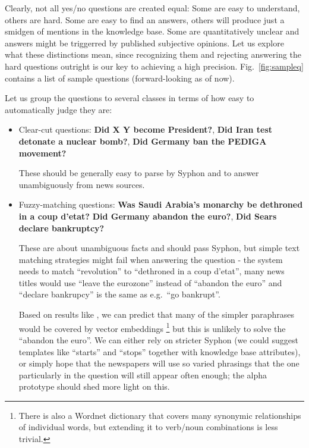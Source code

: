 \documentclass[11pt,a4paper]{article}
\begin{document}
Clearly, not all yes/no questions are created equal:
Some are easy to understand, others are hard.
Some are easy to find an answers, others will produce just a smidgen of mentions in the knowledge base.
Some are quantitatively unclear and answers might be triggerred by published subjective opinions.
Let us explore what these distinctions mean,
since recognizing them and rejecting answering
the hard questions outright is our key to achieving a high precision.
Fig.~\ref{fig:sampleq} contains a list of sample questions (forward-looking as of now).

Let us group the questions to several classes in terms of how easy to automatically judge they are:

\begin{itemize}
	\item Clear-cut questions: \textbf{Did X Y become President?},
		\textbf{Did Iran test detonate a nuclear bomb?},
		\textbf{Did Germany ban the PEDIGA movement?}

		These should be generally easy to parse by Syphon
		and to answer unambiguously from news sources.

	\item Fuzzy-matching questions: \textbf{Was Saudi Arabia’s monarchy be dethroned in a coup d’etat?}
		\textbf{Did Germany abandon the euro?},
		\textbf{Did Sears declare bankruptcy?}

		These are about unambiguous facts and should pass Syphon,
		but simple text matching strategies might fail when
		answering the question - the system needs to match
		``revolution'' to ``dethroned in a coup d'etat'',
		many news titles would use ``leave the eurozone''
		instead of ``abandon the euro'' and ``declare bankrupcy''
		is the same as e.g.\ ``go bankrupt''.

		Based on results like \cite{DefGen,QANTA},
		we can predict that many of the simpler paraphrases
		would be covered by vector embeddings%
\footnote{There is also a Wordnet dictionary that covers many synonymic relationships of individual words, but extending it to verb/noun combinations is less trivial.}
		but this is unlikely to solve the ``abandon the euro''.
		We can either rely on stricter Syphon
		(we could suggest templates like ``starts'' and ``stops''
		together with knowledge base attributes),
		or simply hope that the newspapers will use so varied
		phrasings that the one particularly in the question
		will still appear often enough; the alpha prototype
		should shed more light on this.


\end{itemize}
\end{document}
